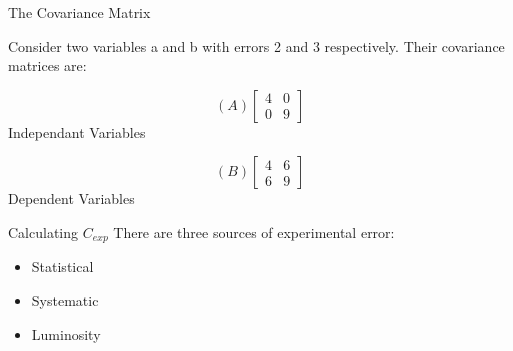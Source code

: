 \documentclass[14pt]{beamer}
\begin{document}
\begin{frame}[fragile]{The Covariance Matrix}

Consider two variables a and b with errors 2 and 3 respectively. Their covariance matrices are:
	\begin{minipage}{.5\linewidth}
		\centering
		\[(A)\left[\begin{array}{cc}
		4 & 0 \\
		0 & 9
		\end{array}\right]\]
		Independant Variables
	\end{minipage}%
	\begin{minipage}{.5\linewidth}
		\centering
		\[(B)\left[\begin{array}{cc}
		4 & 6 \\
		6 & 9
		\end{array}\right]\]
		Dependent Variables
	\end{minipage}

\end{frame}
\begin{frame}[fragile]{Calculating ${C_{exp}}$}
There are three sources of experimental error: \begin{itemize}
	\item Statistical
	\item Systematic
	\item Luminosity
\end{itemize}

\end{frame}
\end{document}

